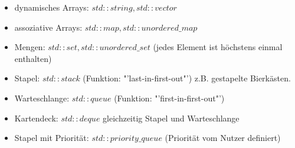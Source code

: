 \documentclass{article}
\begin{document}
	 \begin{itemize}
	 	\item dynamisches Arrays: $std::string, std::vector$
	 	\item assoziative Arrays: $std::map, std::unordered\_map$
	 	\item Mengen: $std::set, std::unordered\_set$ (jedes Element ist höchstens einmal enthalten)
	 	\item Stapel: $std::stack$ (Funktion: "'last-in-first-out"') z.B. gestapelte Bierkästen.
	 	\item Warteschlange: $std::queue$ (Funktion: "'first-in-first-out"')
	 	\item Kartendeck: $std::deque$ gleichzeitig Stapel und Warteschlange
	 	\item Stapel mit Priorität: $std::priority\_queue$ (Priorität vom Nutzer definiert)
	 \end{itemize}
	 	
\end{document}
